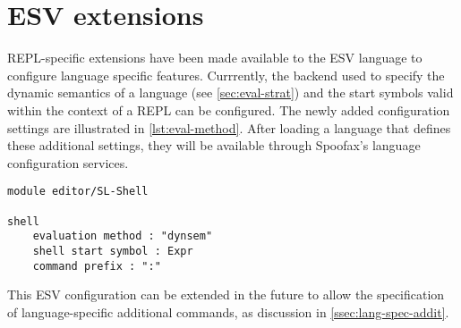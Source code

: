 \section{ESV extensions}
\label{sec:esv-extensions}

REPL-specific extensions have been made available to the ESV language to
configure language specific features. Currrently, the backend used to specify
the dynamic semantics of a language (see \cref{sec:eval-strat}) and the start
symbols valid within the context of a REPL can be configured. The newly added
configuration settings are illustrated in \cref{lst:eval-method}. After loading
a language that defines these additional settings, they will be available
through Spoofax's language configuration services.

\begin{lstlisting}[language=esv,caption={Configuring language specific settings.},label={lst:eval-method}]
module editor/SL-Shell

shell
    evaluation method : "dynsem"
    shell start symbol : Expr
    command prefix : ":"
\end{lstlisting}

This ESV configuration can be extended in the future to allow the specification
of language-specific additional commands, as discussion in
\cref{ssec:lang-spec-addit}.

